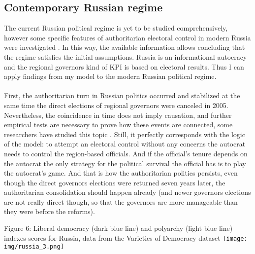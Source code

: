 \documentclass[a4paper, 12pt]{article}
\begin{document}
	\subsection*{Contemporary Russian regime}
	The current Russian political regime is yet to be studied comprehensively, however some specific features of authoritarian electoral control in modern Russia were investigated \parencite{golosov, russianregons, post-soviet}. In this way, the available information allows concluding that the regime satisfies the initial assumptions. Russia is an informational autocracy \parencite{inform} and the regional governors kind of KPI is based on electoral results. Thus I can apply findings from my model to the modern Russian political regime.
    \\\\    
	\noindent First, the authoritarian turn in Russian politics occurred and stabilized at the same time the direct elections of regional governors were canceled in 2005. Nevertheless, the coincidence in time does not imply causation, and further empirical tests are necessary to prove how these events are connected, some researchers have studied this topic \parencite{governors}. Still, it perfectly corresponds with the logic of the model: to attempt an electoral control without any concerns the autocrat needs to control the region-based officials. And if the official's tenure depends on the autocrat the only strategy for the political survival the official has is to play the autocrat's game. And that is how the authoritarian politics persists, even though the direct governors elections were returned seven years later, the authoritarian consolidation should happen already (and newer governors elections are not really direct though, so that the governors are more manageable than they were before the reforms).
    
	\begin{center}
	    Figure 6: Liberal democracy (dark blue line) and polyarchy (light blue line) indexes scores for Russia, data from the Varieties of Democracy dataset \parencite{vdem_data}
	    \texttt{[image: img/russia\_3.png]}
	\end{center}
	
\end{document}
